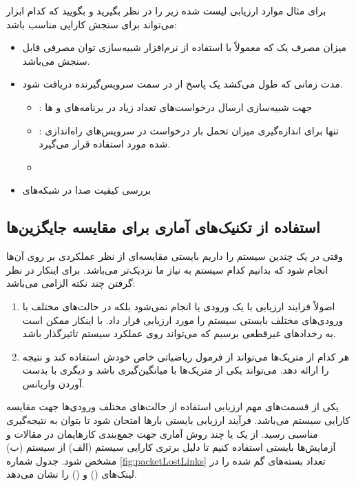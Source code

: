 برای مثال موارد ارزیابی لیست شده زیر را در نظر بگیرید و بگویید که کدام ابزار
می‌تواند برای سنجش کارایی مناسب باشد:

\begin{itemize}
    \item میزان مصرف یک  که معمولاً با استفاده از نرم‌افزار شبیه‌سازی
    توان مصرفی  قابل سنجش می‌باشد.
    \item مدت زمانی که طول می‌کشد یک پاسخ از  در سمت سرویس‌گیرنده
    دریافت شود.
    \begin{itemize}
        \item {}: جهت شبیه‌سازی ارسال درخواست‌های تعداد زیاد در
        برنامه‌های  و ها
        \item {}: تنها برای اندازه‌گیری میزان تحمل بار
        درخواست در سرویس‌های راه‌اندازی شده  مورد استفاده قرار
        می‌گیرد.
        \item {}
    \end{itemize}
    \item بررسی کیفیت صدا در شبکه‌های 
\end{itemize}

\subsection{استفاده از تکنیک‌های آماری برای مقایسه جایگزین‌ها}

وقتی در یک  چندین سیستم را داریم بایستی مقایسه‌ای از نظر
عملکردی بر روی آن‌ها انجام شود که بدانیم کدام سیستم به نیاز ما نزدیک‌تر می‌باشد.
برای اینکار در نظر گرفتن چند نکته الزامی می‌باشد:

\begin{enumerate}
    \item اصولاً فرایند ارزیابی با یک ورودی یا  انجام نمی‌شود بلکه
    در حالت‌های مختلف با ورودی‌های مختلف بایستی سیستم را مورد ارزیابی قرار داد.
    با اینکار ممکن است به رخداد‌های غیرقطعی برسیم که می‌تواند روی عملکرد سیستم
    تاثیرگذار باشد.
    \item هر کدام از متریک‌ها می‌تواند از فرمول ریاضیاتی خاص خودش استفاده کند و
    نتیجه را ارائه دهد. می‌تواند یکی از متریک‌ها با میانگین‌گیری باشد و دیگری با
    بدست آوردن واریانس.
\end{enumerate}

یکی از قسمت‌های مهم ارزیابی استفاده از حالت‌های مختلف ورودی‌ها جهت مقایسه کارایی
سیستم می‌باشد. فرآیند ارزیابی بایستی بار‌ها امتحان شود تا بتوان به نتیجه‌گیری
مناسبی رسید. از یک یا چند روش آماری جهت جمع‌بندی کار‌هایمان در مقالات و
آزمایش‌ها بایستی استفاده کنیم تا دلیل برتری کارایی سیستم (الف) از سیستم (ب) مشخص
شود. جدول شماره \ref{fig:packetLostLinks} تعداد بسته‌های گم شده را در لینک‌های
() و () را نشان می‌دهد.

